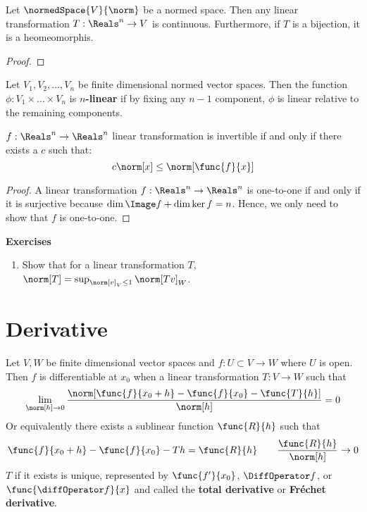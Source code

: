\begin{theorem}
    Let \(\normedSpace{V}{\norm}\) be a normed space. Then any linear transformation \(T: \Reals^n \to V\) is continuous. Furthermore, if \(T\) is a bijection, it is a heomeomorphis.
\end{theorem}
\begin{proof}

\end{proof}

\begin{definition}
    Let \(V_1, V_2 ,\dots , V_n\) be finite dimensional normed vector spaces. Then the function \(\phi : V_1 \times \dots \times V_n\) is \textbf{\(n\)-linear} if by fixing any \(n-1\) component, \(\phi\) is linear relative to the remaining components.
\end{definition}

\begin{theorem}
    \(f : \Reals^n \to \Reals^n\) linear transformation is invertible if and only if there exists a \(c\) such that:
    \begin{equation*}
        c \norm[x] \leq \norm[\func{f}{x}]
    \end{equation*}
\end{theorem}

\begin{proof}
    A linear transformation \(f: \Reals^n \to \Reals^n\) is one-to-one if and only if it is surjective because \(\dim \Image f + \dim \ker f = n\). Hence, we only need to show that \(f\) is one-to-one.
\end{proof}

{\Large\textbf{Exercises}}
\begin{enumerate}
    \item Show that for a linear transformation \(T\), \(\norm[T] = \sup_{\norm[v]_V \leq 1} \norm[Tv]_W\).
\end{enumerate}
\newpage

\section{Derivative}
Let \(V,W\) be finite dimensional vector spaces and \(f: U \subset V \to W\) where \(U\) is open. Then \(f\) is differentiable at \(x_0\) when a linear transformation \(T : V \to W\) such that
\begin{equation*}
    \lim_{\norm[h] \to 0} \dfrac{\norm[\func{f}{x_0 + h} - \func{f}{x_0} - \func{T}{h}]}{\norm[h]}= 0
\end{equation*}
Or equivalently there exists a sublinear function \(\func{R}{h}\) such that
\begin{equation*}
    \func{f}{x_0 + h} - \func{f}{x_0} - Th = \func{R}{h} \qquad \frac{\func{R}{h}}{\norm[h]} \to 0
\end{equation*}
\(T\) if it exists is unique, represented by \(\func{f'}{x_0}\), \(\DiffOperator f\), or \(\func{\diffOperator f}{x}\) and called the \textbf{total derivative} or \textbf{Fr\'{e}chet derivative}.

